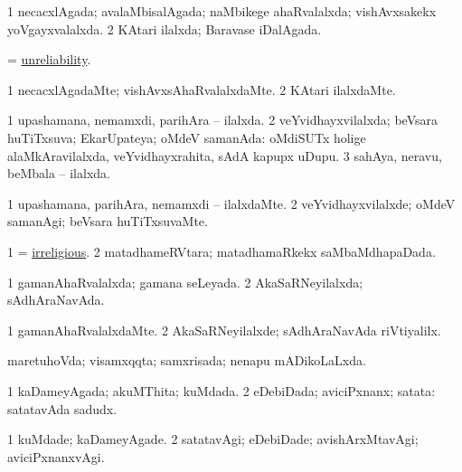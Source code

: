 \bentry
{} 
\gl{\gu}
\expl{}
\bmng
\bnum
\num{1} necacxlAgada; avalaMbisalAgada; naMbikege ahaRvalalxda; vishAvxsakekx yoVgayxvalalxda. 
\num{2} KAtari ilalxda; Baravase iDalAgada. 
\enum
\emng
\eentry

\bentry
{} 
\gl{\nA}
\expl{}
\bmng
= \hyperlink{unreliability}{unreliability}. 
\emng
\eentry

\bentry
{} 
\gl{\kirxvi}
\expl{}
\bmng
\bnum
\num{1} necacxlAgadaMte; vishAvxsAhaRvalalxdaMte. 
\num{2} KAtari ilalxdaMte. 
\enum
\emng
\eentry

\bentry
{} 
\gl{\gu}
\expl{}
\bmng
\bnum
\num{1} upashamana, nemamxdi, parihAra -- ilalxda. 
\num{2} veYvidhayxvilalxda; beVsara huTiTxsuva; EkarUpateya; oMdeV samanAda:  oMdiSUTx holige alaMkAravilalxda, veYvidhayxrahita, sAdA kapupx uDupu. 
\num{3} sahAya, neravu, beMbala -- ilalxda. 
\enum
\emng
\eentry

\bentry
{} 
\gl{\kirxvi}
\expl{}
\bmng
\bnum
\num{1} upashamana, parihAra, nemamxdi -- ilalxdaMte. 
\num{2} veYvidhayxvilalxde; oMdeV samanAgi; beVsara huTiTxsuvaMte. 
\enum
\emng
\eentry

\bentry
{} 
\gl{\gu}
\expl{}
\bmng
\bnum
\num{1} = \hyperref{kandict_i.pdf}{I}{irreligious}{irreligious}. 
\num{2} matadhameRVtara; matadhamaRkekx saMbaMdhapaDada. 
\enum
\emng
\eentry

\bentry
{} 
\gl{\gu}
\expl{}
\bmng
\bnum
\num{1} gamanAhaRvalalxda; gamana seLeyada. 
\num{2} AkaSaRNeyilalxda; sAdhAraNavAda. 
\enum
\emng
\eentry

\bentry
{} 
\gl{\kirxvi}
\expl{}
\bmng
\bnum
\num{1} gamanAhaRvalalxdaMte. 
\num{2} AkaSaRNeyilalxde; sAdhAraNavAda riVtiyalilx. 
\enum
\emng
\eentry

\bentry
{} 
\gl{\gu}
\expl{}
\bmng
maretuhoVda; visamxqqta; samxrisada; nenapu mADikoLaLxda. 
\emng
\eentry

\bentry
{} 
\gl{\gu}
\expl{}
\bmng
\bnum
\num{1} kaDameyAgada; akuMThita; kuMdada. 
\num{2} eDebiDada; aviciPxnanx; satata:  satatavAda sadudx. 
\enum
\emng
\eentry

\bentry
{} 
\gl{\kirxvi}
\expl{}
\bmng
\bnum
\num{1} kuMdade; kaDameyAgade. 
\num{2} satatavAgi; eDebiDade; avishArxMtavAgi; aviciPxnanxvAgi. 
\enum
\emng
\eentry

